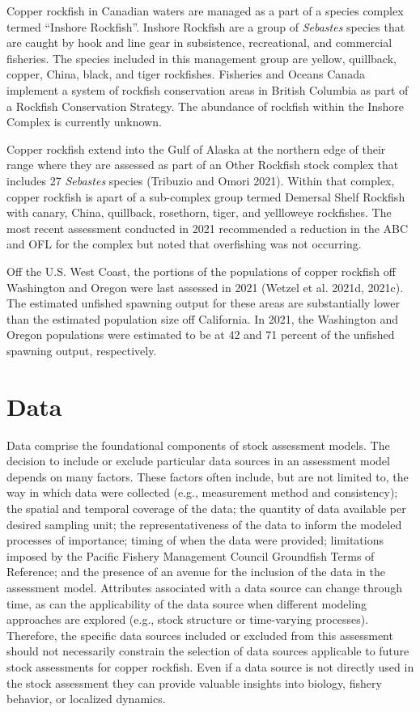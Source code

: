 \documentclass[11pt,
  english,
  letterpaper,
]{article}
\begin{document}
Copper rockfish in Canadian waters are managed as a part of a species complex termed ``Inshore Rockfish''. Inshore Rockfish are a group of \emph{Sebastes} species that are caught by hook and line gear in subsistence, recreational, and commercial fisheries. The species included in this management group are yellow, quillback, copper, China, black, and tiger rockfishes. Fisheries and Oceans Canada implement a system of rockfish conservation areas in British Columbia as part of a Rockfish Conservation Strategy. The abundance of rockfish within the Inshore Complex is currently unknown.

Copper rockfish extend into the Gulf of Alaska at the northern edge of their range where they are assessed as part of an Other Rockfish stock complex that includes 27 \emph{Sebastes} species (Tribuzio and Omori 2021). Within that complex, copper rockfish is apart of a sub-complex group termed Demersal Shelf Rockfish with canary, China, quillback, rosethorn, tiger, and yellloweye rockfishes. The most recent assessment conducted in 2021 recommended a reduction in the ABC and OFL for the complex but noted that overfishing was not occurring.

Off the U.S. West Coast, the portions of the populations of copper rockfish off Washington and Oregon were last assessed in 2021 (Wetzel et al. 2021d, 2021c). The estimated unfished spawning output for these areas are substantially lower than the estimated population size off California. In 2021, the Washington and Oregon populations were estimated to be at 42 and 71 percent of the unfished spawning output, respectively.

\hypertarget{data}{%
\section{Data}\label{data}}

Data comprise the foundational components of stock assessment models. The decision to include or exclude particular data sources in an assessment model depends on many factors. These factors often include, but are not limited to, the way in which data were collected (e.g., measurement method and consistency); the spatial and temporal coverage of the data; the quantity of data available per desired sampling unit; the representativeness of the data to inform the modeled processes of importance; timing of when the data were provided; limitations imposed by the Pacific Fishery Management Council Groundfish Terms of Reference; and the presence of an avenue for the inclusion of the data in the assessment model. Attributes associated with a data source can change through time, as can the applicability of the data source when different modeling approaches are explored (e.g., stock structure or time-varying processes). Therefore, the specific data sources included or excluded from this assessment should not necessarily constrain the selection of data sources applicable to future stock assessments for copper rockfish. Even if a data source is not directly used in the stock assessment they can provide valuable insights into biology, fishery behavior, or localized dynamics.
\end{document}
